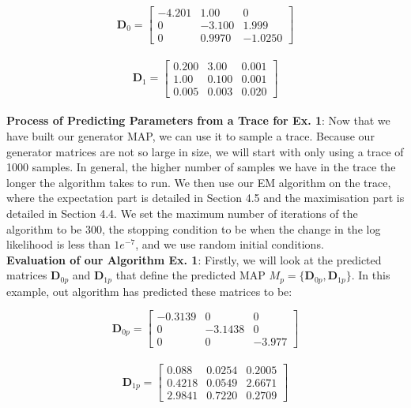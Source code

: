 \documentclass[a4paper,11pt,titlepage]{article}
\begin{document}
\begin{equation}
    \mathbf{D}_0 = 
\begin{bmatrix}
-4.201 & 1.00 & 0\\
0 & -3.100 & 1.999\\
0 & 0.9970 & -1.0250
\end{bmatrix}
\end{equation} \\

\begin{equation}
    \mathbf{D}_1 = 
\begin{bmatrix}
0.200 & 3.00 & 0.001\\
1.00 & 0.100 & 0.001\\
0.005 & 0.003 & 0.020
\end{bmatrix}
\end{equation} \\

\textbf{Process of Predicting Parameters from a Trace for Ex. 1}: Now that we have built our generator MAP, we can use it to sample a trace. Because our generator matrices are not so large in size, we will start with only using a trace of 1000 samples. In general, the higher number of samples we have in the trace the longer the algorithm takes to run. We then use our EM algorithm on the trace, where the expectation part is detailed in Section 4.5 and the maximisation part is detailed in Section 4.4. We set the maximum number of iterations of the algorithm to be 300, the stopping condition to be when the change in the log likelihood is less than $1e^{-7}$, and we use random initial conditions. \\

\textbf{Evaluation of our Algorithm Ex. 1}: Firstly, we will look at the predicted matrices $\mathbf{D}_{0p}$ and $\mathbf{D}_{1p}$ that define the predicted MAP $M_{p} = \{\mathbf{D}_{0p},\mathbf{D}_{1p}\}$. In this example, out algorithm has predicted these matrices to be: 

\begin{equation}
    \mathbf{D}_{0p} = 
\begin{bmatrix}
-0.3139 & 0 & 0\\
0 & -3.1438 & 0\\
0 & 0 & -3.977
\end{bmatrix}
\end{equation} \\

\begin{equation}
    \mathbf{D}_{1p} = 
\begin{bmatrix}
0.088 & 0.0254 & 0.2005\\
0.4218 & 0.0549 & 2.6671\\
2.9841 & 0.7220 & 0.2709
\end{bmatrix}
\end{equation} \\
\end{document}
